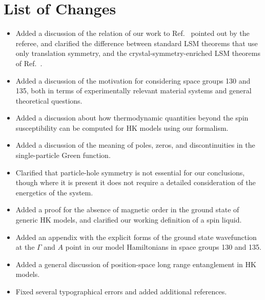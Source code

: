 \documentclass[aps,reprint,notitlepage,onecolumn,12pt]{revtex4-2}
\numberwithin{equation}{section}
\begin{document}
\section*{List of Changes}
\begin{itemize}
	\item Added a discussion of the relation of our work to Ref.~\cite{lsmyin2022} pointed out by the referee, and clarified the difference between standard LSM theorems that use only translation symmetry, and the crystal-symmetry-enriched LSM theorems of Ref.~\cite{watanabe2015filling}.
	\item Added a discussion of the motivation for considering space groups 130 and 135, both in terms of experimentally relevant material systems and general theoretical questions.
	\item Added a discussion about how thermodynamic quantities beyond the spin susceptibility can be computed for HK models using our formalism.
	\item Added a discussion of the meaning of poles, zeros, and discontinuities in the single-particle Green function.
	\item Clarified that particle-hole symmetry is not essential for our conclusions, though where it is present it does not require a detailed consideration of the energetics of the system.
	\item Added a proof for the absence of magnetic order in the ground state of generic HK models, and clarified our working definition of a spin liquid.
	\item Added an appendix with the explicit forms of the ground state wavefunction at the $\Gamma$ and $A$ point in our model Hamiltonians in space groups 130 and 135. 
	\item Added a general discussion of position-space long range entanglement in HK models.
    \item Fixed several typographical errors and added additional references.
\end{itemize}
\newpage
\end{document}
